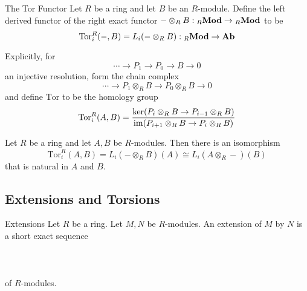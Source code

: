 \documentclass[a4paper]{article}
\begin{document}
\begin{defn}{The Tor Functor}{} Let $R$ be a ring and let $B$ be an $R$-module. Define the left derived functor of the right exact functor $-\otimes_RB:{ _R\bold{Mod}}\to{_R\bold{Mod}}$ to be $$\text{Tor}_i^R(-,B)=L_i(-\otimes_RB):{_R\bold{Mod}}\to\bold{Ab}$$ 
\end{defn}

Explicitly, for $$\cdots\to P_1\to P_0\to B\to 0$$ an injective resolution, form the chain complex $$\cdots\to P_1\otimes_RB\to P_0\otimes_RB\to 0$$ and define $\text{Tor}$ to be the homology group $$\text{Tor}_i^R(A,B)=\frac{\ker(P_i\otimes_RB\to P_{i-1}\otimes_RB)}{\operatorname{im}(P_{i+1}\otimes_RB\to P_i\otimes_RB)}$$

\begin{thm}{}{} Let $R$ be a ring and let $A,B$ be $R$-modules. Then there is an isomorphism $$\text{Tor}_i^R(A,B)=L_i(-\otimes_RB)(A)\cong L_i(A\otimes_R-)(B)$$ that is natural in $A$ and $B$. 
\end{thm}

\subsection{Extensions and Torsions}
\begin{defn}{Extensions}{} Let $R$ be a ring. Let $M,N$ be $R$-modules. An extension of $M$ by $N$ is a short exact sequence \\~\\
 \\~\\
of $R$-modules. 
\end{defn}
\end{document}
